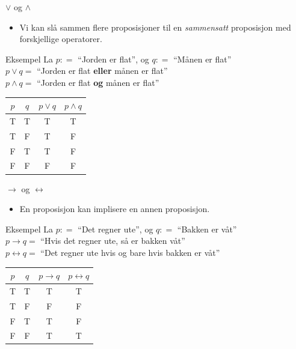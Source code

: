 \begin{frame}{$\lor$ og $\land$}
    \begin{itemize}
        \item Vi kan slå sammen flere proposisjoner til en \emph{sammensatt} proposisjon med forskjellige operatorer.
    \end{itemize}
    \begin{block}{Eksempel}
        La $p : =$ ``Jorden er flat'', og $q : =$ ``Månen er flat''\\
        $p \lor q = $ ``Jorden er flat \textbf{eller} månen er flat''\\
        $p \land q = $ ``Jorden er flat \textbf{og} månen er flat''\\
    \end{block}
    \pause
    \begin{center}
        \begin{tabular}{c|c|c|c}
            $p$ & $q$ & $p \lor q$ & $p \land q$ \\ \hline
            T & T & T & T \\
            T & F & T & F \\
            F & T & T & F \\
            F & F & F & F \\
        \end{tabular}
    \end{center}
\end{frame}

\begin{frame}{$\rightarrow$ og $\leftrightarrow$}
    \begin{itemize}
        \item En proposisjon kan implisere en annen proposisjon.
    \end{itemize}
    \begin{block}{Eksempel}
        La $p : = $ ``Det regner ute'', og $q : =$ ``Bakken er våt''\\
        $p \rightarrow q = $ ``Hvis det regner ute, så er bakken våt''\\
        $p \leftrightarrow q = $ ``Det regner ute hvis og bare hvis bakken er våt''
    \end{block}
    \pause
    \begin{center}
        \begin{tabular}{c|c|c|c}
            $p$ & $q$ & $p \rightarrow q$ & $p \leftrightarrow q$ \\ \hline
            T & T & T & T \\
            T & F & F & F \\
            F & T & T & F \\
            F & F & T & T \\
        \end{tabular}
    \end{center}
\end{frame}

